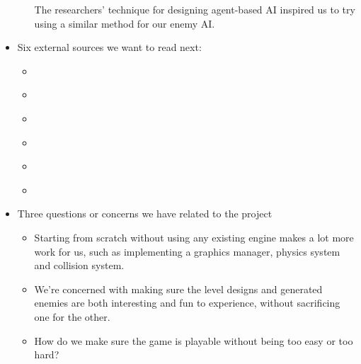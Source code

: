 \documentclass[a4paper, 10pt, american]{article}
\begin{document}
\begin{itemize}
\begin{itemize}
				The researchers' technique for designing agent-based AI inspired
				us to try using a similar method for our enemy AI.
		\end{itemize}
	\item Six external sources we want to read next:
		\begin{itemize}
			\item \cite{jain2016autoencoders}
			\item \cite{van2013procedural}
			\item \cite{shaker2016constructive}
			\item \cite{smith2009rhythm}
			\item \cite{dewsbury2016scalable}
			\item \cite{bizopoulos2014randomly}
		\end{itemize}
	\item Three questions or concerns we have related to the project
		\begin{itemize}
			\item Starting from scratch without using any existing engine makes
				a lot more work for us, such as implementing a graphics manager,
				physics system and collision system.
			\item We're concerned with making sure the level designs and
				generated enemies are both interesting and fun to experience,
				without sacrificing one for the other.
			\item How do we make sure the game is playable without being too
				easy or too hard?
		\end{itemize}
\end{itemize}



\end{document}
